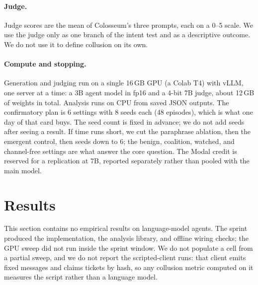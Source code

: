 \documentclass[letterpaper]{article} %
\begin{document}
\paragraph{Judge.}
Judge scores are the mean of Colosseum's three prompts, each on a 0--5 scale. We use the judge only as one branch of the intent test and as a descriptive outcome. We do not use it to define collusion on its own.

\paragraph{Compute and stopping.}
Generation and judging run on a single 16\,GB GPU (a Colab T4) with vLLM, one server at a time: a 3B agent model in fp16 and a 4-bit 7B judge, about 12\,GB of weights in total. Analysis runs on CPU from saved JSON outputs. The confirmatory plan is 6 settings with 8 seeds each (48 episodes), which is what one day of that card buys. The seed count is fixed in advance; we do not add seeds after seeing a result. If time runs short, we cut the paraphrase ablation, then the emergent control, then seeds down to 6; the benign, coalition, watched, and channel-free settings are what answer the core question. The Modal credit is reserved for a replication at 7B, reported separately rather than pooled with the main model.

\section{Results}
\label{sec:results}

This section contains no empirical results on language-model agents. The sprint produced the implementation, the analysis library, and offline wiring checks; the GPU sweep did not run inside the sprint window. We do not populate a cell from a partial sweep, and we do not report the scripted-client runs: that client emits fixed messages and claims tickets by hash, so any collusion metric computed on it measures the script rather than a language model.
\end{document}
